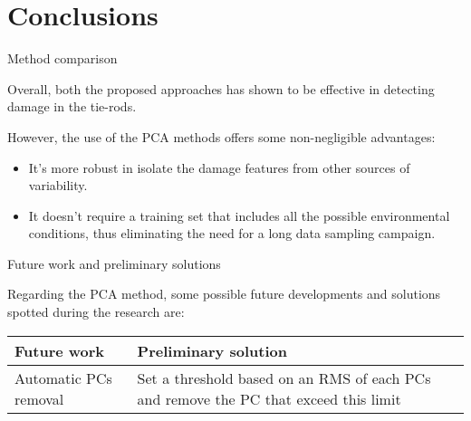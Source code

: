 \section{Conclusions}

\begin{frame}{Method comparison}

    Overall, both the proposed approaches has shown to be effective in detecting damage in the tie-rods.

    However, the use of the PCA methods offers some non-negligible advantages:

    \begin{itemize}
        \item It's more robust in isolate the damage features from other sources of variability.
        \item It doesn't require a training set that includes all the possible environmental conditions, thus eliminating the need for a long data sampling campaign.
    \end{itemize}

\end{frame}



\begin{frame}{Future work and preliminary solutions}

    Regarding the PCA method, some possible future developments and solutions spotted during the research are:

    \begin{table}
        \centering
        \begin{tabular}{l|l}
            \textbf{Future work}  & \textbf{Preliminary solution}                                                        \\
            \hline
            Automatic PCs removal & Set a threshold based on an RMS of each PCs and remove the PC that exceed this limit \\
            \hline
        \end{tabular}
    \end{table}

\end{frame}
